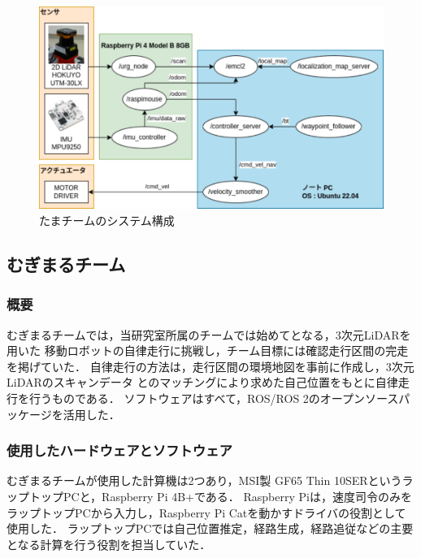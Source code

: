 \documentclass[twocolumn,9pt]{jsproceedings}
\begin{document}
\begin{figure}[h]
  \begin{center}
    \includegraphics[width=1.0\linewidth]{figs/tama_system_diagram.pdf}
    \caption{たまチームのシステム構成}
    \label{fig:tama_system_diagram}
  \end{center}
\end{figure}

\subsection{むぎまるチーム}

\subsubsection{概要}

むぎまるチームでは，当研究室所属のチームでは始めてとなる，3次元LiDARを用いた
移動ロボットの自律走行に挑戦し，チーム目標には確認走行区間の完走を掲げていた．
自律走行の方法は，走行区間の環境地図を事前に作成し，3次元LiDARのスキャンデータ
とのマッチングにより求めた自己位置をもとに自律走行を行うものである．
ソフトウェアはすべて，ROS/ROS 2のオープンソースパッケージを活用した．

\subsubsection{使用したハードウェアとソフトウェア}

むぎまるチームが使用した計算機は2つあり，MSI製 GF65 Thin 10SERというラップトップPCと，Raspberry Pi 4B+である．
Raspberry Piは，速度司令のみをラップトップPCから入力し，Raspberry Pi Catを動かすドライバの役割として使用した．
ラップトップPCでは自己位置推定，経路生成，経路追従などの主要となる計算を行う役割を担当していた．
\end{document}
